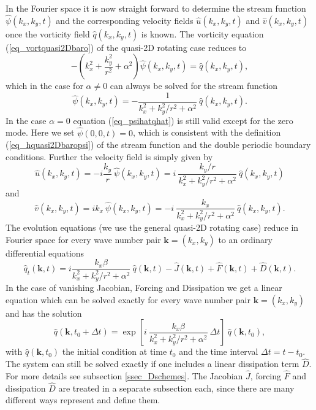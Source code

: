 In the Fourier space it is now straight forward to determine
the stream function $\hat{\psi}(k_{x},k_{y},t)$ and the corresponding
velocity fields $\hat{u}(k_{x},k_{y},t)$ and $\hat{v}(k_{x},k_{y},t)$ once
the vorticity field $\hat{q}(k_{x},k_{y},t)$ is known. The
vorticity equation (\ref{eq_vortquasi2Dbaro}) of the quasi-2D
rotating case reduces to
\begin{equation} \label{eq_fourvortquasi2Dbaro}
 -\left(k_{x}^{2} + \frac{k_{y}^{2}}{r^{2}} + \alpha^{2} \right) 
  \hat{\psi}(k_{x},k_{y},t)
  =
 \hat{q}(k_{x},k_{y},t),
\end{equation}
which in the case for $\alpha \ne 0$ can always be solved for the
stream function
\begin{equation} \label{eq_psihatqhat}
  \hat{\psi}(k_{x},k_{y},t)
  =
  - \frac{1}
  {k_{x}^{2} + k_{y}^{2}/r^{2} + \alpha^{2}} \
  \hat{q}(k_{x},k_{y},t).
\end{equation}
In the case $\alpha = 0$ equation (\ref{eq_psihatqhat}) is still
valid except for the zero mode. Here we set $\hat{\psi}(0,0,t) = 0$,
which is consistent with the definition (\ref{eq_hquasi2Dbaropsi})
of the stream function and the double periodic boundary conditions.
Further the velocity field is simply given by
\begin{equation} \label{eq_uhat}
 \hat{u}(k_{x},k_{y},t) 
  =  -i \frac{k_{y}}{r} \ \hat{\psi}(k_{x},k_{y},t)
  = i \ \frac{k_{y}/r }
  {k_{x}^{2} + k_{y}^{2}/r^{2} + \alpha^{2}} \
  \hat{q}(k_{x},k_{y},t)
\end{equation}
and
\begin{equation} \label{eq_vhat}
 \hat{v}(k_{x},k_{y},t) = i k_{x} \ \hat{\psi}(k_{x},k_{y},t)
  = - i \ \frac{k_{x}}
  {k_{x}^{2} + k_{y}^{2}/r^{2} + \alpha^{2}} \
  \hat{q}(k_{x},k_{y},t).
\end{equation}
The evolution equations (we use the general quasi-2D rotating case)
reduce in Fourier space for every wave number pair
$\mathbf{k} = (k_{x},k_{y})$ to an ordinary differential equations
\begin{equation} \label{eq_evolqhat}
  \hat{q}_{t}(\mathbf{k},t)  
   = 
     i \frac{k_{x} \beta}{k_{x}^{2} + k_{y}^{2}/r^{2} + \alpha^{2}} 
     \ \hat{q}(\mathbf{k},t) 
   - \hat{J}(\mathbf{k},t)  
   + \hat{F}(\mathbf{k},t) 
   + \hat{D}(\mathbf{k},t).
\end{equation}
In the case of vanishing Jacobian, Forcing and Dissipation we get
a linear equation which can be solved exactly for every wave number
pair $\mathbf{k} = (k_{x},k_{y})$  and has the solution
\begin{equation} \label{eq_qhatbetasol}
 \hat{q}(\mathbf{k},t_{0} + \Delta t) 
  = 
 \exp 
  \left[
   i \ \frac{k_{x} \beta}{k_{x}^{2} + k_{y}^{2}/r^{2} + \alpha^{2}} \
   \Delta t 
  \right] 
 \ \hat{q}(\mathbf{k},t_{0}), 
\end{equation}
with $\hat{q}(\mathbf{k},t_{0})$ the initial condition at time $t_{0}$
and the time interval $\Delta t = t - t_{0}$.
The system can still be solved exactly if one includes a linear
dissipation term $\hat{D}$. For more details see subsection
\ref{ssec_Dschemes}. The Jacobian $\hat{J}$, forcing $\hat{F}$
and dissipation $\hat{D}$ are treated in a separate subsection each,
since there are many different ways represent and define them.


